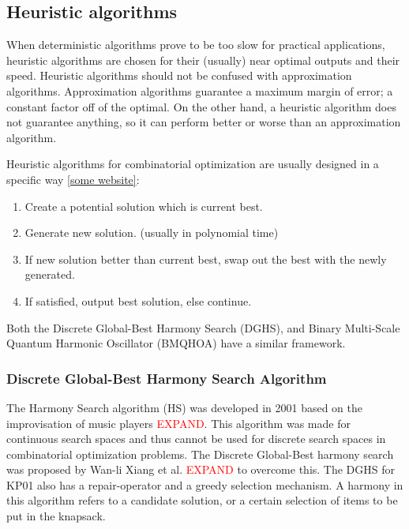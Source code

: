 \documentclass[titlepage]{article}
\begin{document}
\subsection*{Heuristic algorithms}
When deterministic algorithms prove to be too slow for practical applications, heuristic algorithms are chosen for their (usually) near optimal outputs and their speed. Heuristic algorithms should not be confused with approximation algorithms. Approximation algorithms guarantee a maximum margin of error; a constant factor off of the optimal. On the other hand, a heuristic algorithm does not guarantee anything, so it can perform better or worse than an approximation algorithm. 

Heuristic algorithms for combinatorial optimization are usually designed in a specific way \ref{some website}:
\begin{enumerate}
    \item Create a potential solution which is current best.
    \item Generate new solution. (usually in polynomial time) 
    \item If new solution better than current best, swap out the best with the newly generated. 
    \item If satisfied, output best solution, else continue.
\end{enumerate}

Both the Discrete Global-Best Harmony Search (DGHS), and Binary Multi-Scale Quantum Harmonic Oscillator (BMQHOA) have a similar framework.

\subsubsection{Discrete Global-Best Harmony Search Algorithm}
The Harmony Search algorithm (HS) was developed in 2001 \cite{geem01} based on the improvisation of music players \textcolor{red}{EXPAND}. This algorithm was made for continuous search spaces and thus cannot be used for discrete search spaces in combinatorial optimization problems. The Discrete Global-Best harmony search was proposed by Wan-li Xiang et al. \cite{DGHS-article} \textcolor{red}{EXPAND} to overcome this. The DGHS for KP01 also has a repair-operator and a greedy selection mechanism. A harmony in this algorithm refers to a candidate solution, or a certain selection of items to be put in the knapsack. 
\end{document}
